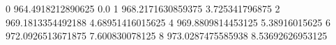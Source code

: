 0 964.4918212890625 0.0
1 968.2171630859375 3.725341796875
2 969.1813354492188 4.68951416015625
4 969.8809814453125 5.38916015625
6 972.0926513671875 7.600830078125
8 973.0287475585938 8.53692626953125
